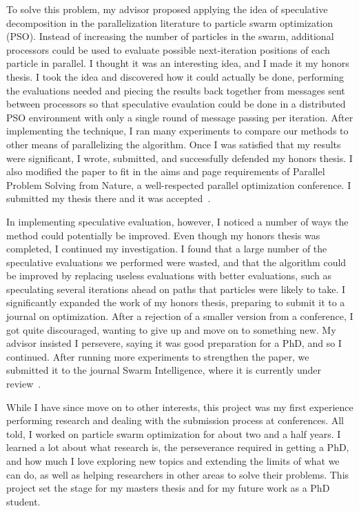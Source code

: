 \documentclass[onecolumn, 12pt]{article}
\begin{document}
To solve this problem, my advisor proposed applying the idea of speculative
decomposition in the parallelization literature to particle swarm optimization
(PSO).  Instead of increasing the number of particles in the swarm, additional
processors could be used to evaluate possible next-iteration positions of each
particle in parallel.  I thought it was an interesting idea, and I made it my
honors thesis.  I took the idea and discovered how it could actually be done,
performing the evaluations needed and piecing the results back together from
messages sent between processors so that speculative evaulation could be done
in a distributed PSO environment with only a single round of message passing
per iteration.  After implementing the technique, I ran many experiments to
compare our methods to other means of parallelizing the algorithm.  Once I was
satisfied that my results were significant, I wrote, submitted, and
successfully defended my honors thesis.  I also modified the paper to fit in
the aims and page requirements of Parallel Problem Solving from Nature, a
well-respected parallel optimization conference.  I submitted my thesis
there and it was accepted~\cite{gardner-2010-speculative-evaluation-in-pso}.

In implementing speculative evaluation, however, I noticed a number of ways the
method could potentially be improved.  Even though my honors thesis was
completed, I continued my investigation.  I found that a large number of the
speculative evaluations we performed were wasted, and that the algorithm could
be improved by replacing useless evaluations with better evaluations, such as
speculating several iterations ahead on paths that particles were likely to
take.  I significantly expanded the work of my honors thesis, preparing to
submit it to a journal on optimization.  After a rejection of a smaller version
from a conference, I got quite discouraged, wanting to give up and move on to
something new.  My advisor insisted I persevere, saying it was good preparation
for a PhD, and so I continued.  After running more experiments to strengthen
the paper, we submitted it to the journal Swarm Intelligence, where it is
currently under
review~\cite{gardner-2010-speculative-approach-to-parallelization-pso}.

While I have since move on to other interests, this project was my first
experience performing research and dealing with the submission process at
conferences.  All told, I worked on particle swarm optimization for about two
and a half years.  I learned a lot about what research is, the perseverance
required in getting a PhD, and how much I love exploring new topics and
extending the limits of what we can do, as well as helping researchers in other
areas to solve their problems.  This project set the stage for my masters
thesis and for my future work as a PhD student.  
\end{document}
